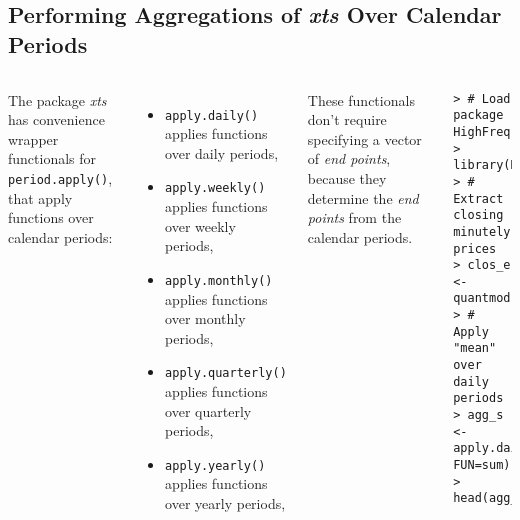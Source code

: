 \documentclass[10pt]{beamer}\usepackage[]{graphicx}\usepackage[]{color}
\makeatletter
\newenvironment{kframe}{%
 \def\at@end@of@kframe{}%
 \ifinner\ifhmode%
  \def\at@end@of@kframe{\end{minipage}}%
  \begin{minipage}{\columnwidth}%
 \fi\fi%
 \def\FrameCommand##1{\hskip\@totalleftmargin \hskip-\fboxsep
 \colorbox{shadecolor}{##1}\hskip-\fboxsep
     \hskip-\linewidth \hskip-\@totalleftmargin \hskip\columnwidth}%
 \MakeFramed {\advance\hsize-\width
   \@totalleftmargin\z@ \linewidth\hsize
   \@setminipage}}%
 {\par\unskip\endMakeFramed%
 \at@end@of@kframe}
\newenvironment{knitrout}{}{} %
\makeatother
\begin{document}
\subsection{Performing Aggregations of \protect\emph{xts} Over Calendar Periods}
\begin{frame}[fragile,t]{\subsecname}
\vspace{-1em}
\begin{block}{}
  \begin{columns}[T]
      The package \emph{xts} has convenience wrapper functionals for \texttt{period.apply()}, that apply functions over calendar periods:
      \begin{itemize}
        \item \texttt{apply.daily()} applies functions over daily periods,
        \item \texttt{apply.weekly()} applies functions over weekly periods,
        \item \texttt{apply.monthly()} applies functions over monthly periods,
        \item \texttt{apply.quarterly()} applies functions over quarterly periods,
        \item \texttt{apply.yearly()} applies functions over yearly periods,
      \end{itemize}
      These functionals don't require specifying a vector of \emph{end points}, because they determine the \emph{end points} from the calendar periods.
      \vspace{-1em}
\begin{knitrout}\tiny
{}\color{fgcolor}\begin{kframe}
\begin{verbatim}
> # Load package HighFreq
> library(HighFreq)
> # Extract closing minutely prices
> clos_e <- quantmod::Cl(rutils::etf_env$VTI["2019"])
> # Apply "mean" over daily periods
> agg_s <- apply.daily(clos_e, FUN=sum)
> head(agg_s)
\end{verbatim}
\end{kframe}
\end{knitrout}
  \end{columns}
\end{block}

\end{frame}


\end{document}
